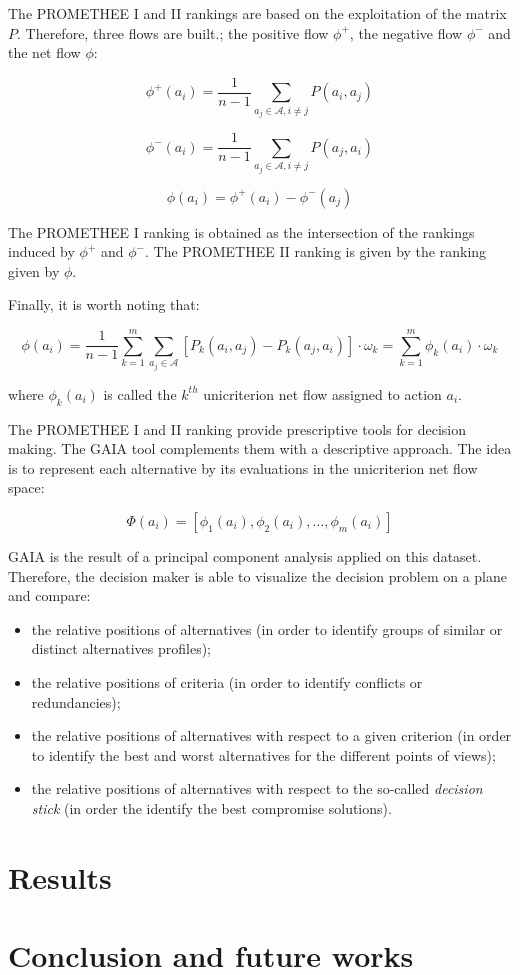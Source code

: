 \documentclass{svmono}
\begin{document}
The PROMETHEE I and II rankings are based on the exploitation of the matrix $P$. Therefore, three flows are built.; the positive flow $\phi^+$, the negative flow $\phi^-$ and the net flow $\phi$:

$$
\phi^+(a_i)= \frac{1}{n-1} \sum_{a_j \in \mathcal{A}, i \ne j}
P(a_i,a_j)
$$

$$
\phi^-(a_i)= \frac{1}{n-1} \sum_{a_j \in \mathcal{A}, i \ne j}
P(a_j,a_i)
$$

$$
\phi(a_i)=\phi^+(a_i)-\phi^-(a_j)
$$

The PROMETHEE I ranking is obtained as the intersection of the rankings induced by $\phi^+$ and $\phi^-$. The PROMETHEE II ranking is given by the ranking given by $\phi$.

Finally, it is worth noting that:

$$
\phi(a_i) = \frac{1}{n-1} \sum_{k=1}^{m} \sum_{a_j \in \mathcal{A}} {[P_k(a_i,a_j)-P_k(a_j,a_i)]} \cdot \omega_k = \sum_{k=1}^{m} \phi_k(a_i) \cdot \omega_k
$$

where $\phi_k(a_i)$ is called the $k^{th}$ unicriterion net flow assigned to action $a_i$.

The PROMETHEE I and II ranking provide prescriptive tools for decision making. The GAIA \cite{MarBra1988} tool complements them with a descriptive approach. The idea is to represent each alternative by its evaluations in the unicriterion net flow space:

$$
\Phi(a_i)=[\phi_1(a_i),\phi_2(a_i),\ldots,\phi_m(a_i)]
$$

GAIA is the result of a principal component analysis applied on this dataset. Therefore, the decision maker is able to visualize the decision problem on a plane and compare:
\begin{itemize}
\item the relative positions of alternatives (in order to identify groups of similar or distinct alternatives profiles);
\item the relative positions of criteria (in order to identify conflicts or redundancies);
\item the relative positions of alternatives with respect to a given criterion (in order to identify the best and worst alternatives for the different points of views);
\item the relative positions of alternatives with respect to the so-called \textit{decision stick} (in order the identify the best compromise solutions).
\end{itemize}



\section{Results}

\section{Conclusion and future works}




\end{document}
